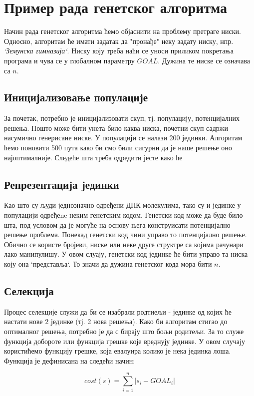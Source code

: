 \documentclass{article}
\begin{document}
\section{Пример рада генетског алгоритма}

Начин рада генетског алгоритма ћемо објаснити на проблему претраге ниски. Односно,
алгоритам ће имати задатак да "пронађе" неку задату ниску, нпр. \textit{`Земунска гимназија`}.
Ниску коју треба наћи се уноси приликом покретања програма и чува се у глобалном
параметру $GOAL$. Дужина те ниске се означава са $n$.

\subsection{Иницијализовање популације}
За почетак, потребно је иницијализовати скуп, тј. популацију, потенцијалних решења.
Пошто може бити унета било каква ниска, почетни скуп садржи насумично генерисане ниске.
У популацији се налази 200 јединки. Алгоритам ћемо поновити 500 пута како би смо били сигурни
да је наше решење оно најоптималније. Следеће шта треба одредити јесте како ће   

\subsection{Репрезентација јединки}
Као што су људи једнозначно одређени ДНК молекулима, тако су и јединке у популацији
одређеne неким генетским кодом. Генетски код може да буде било шта, под условом да
је могуће на основу њега конструисати потенцијално решење проблема. Понекад генетски код
чини управо то потенцијално решење. Обично се користе бројеви, ниске или неке друге 
структре са којима рачунари лако манипулишу. У овом слуају, генетски код јединке
ће бити управо та ниска коју она `представља`. То значи да дужина генетског кода мора бити $n$.

\subsection{Селекција}
Процес селекције служи да би се изабрали родтиељи - јединке од којих ће настати нове
2 јединке (тј. 2 нова решења). Како би алгоритам стигао до оптималног решења, потребно 
је да с бирају што бољи родитељи. За то служе функција добороте или функција грешке које вреднују јединке.
У овом случају користићемо функцију грешке, која евалуира колико је нека јединка лоша. 
Функција је дефинисана на следећи начин: 

\begin{equation*}
    cost(s)=\sum_{i=1}^{n} |s_i - GOAL_i| 
\end{equation*}
\end{document}
